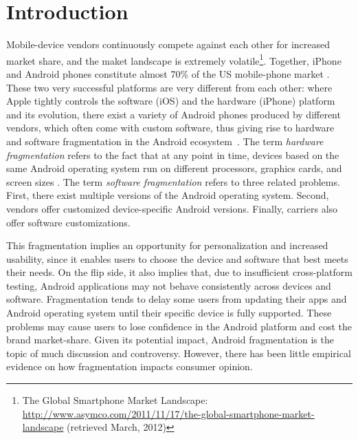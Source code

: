 \documentclass[10pt, conference, compsocconf]{IEEEtran}
\begin{document}
%
\IEEEpeerreviewmaketitle



\section{Introduction}

Mobile-device vendors continuously compete against each other for
increased market share, and the maket landscape is extremely
volatile\footnote{The Global Smartphone Market Landscape:
  \url{http://www.asymco.com/2011/11/17/the-global-smartphone-market-landscape}
  (retrieved March, 2012)}. Together, iPhone and Android phones
constitute almost 70\% of the US mobile-phone market
\cite{usmarket}. These two very successful platforms are very
different from each other: where Apple tightly controls the software
(iOS) and the hardware (iPhone) platform and its evolution, there
exist a variety of Android phones produced by different vendors, which
often come with custom software, thus giving rise to hardware and
software fragmentation in the Android ecosystem~\cite{analysis}. The
term {\em hardware fragmentation} refers to the fact that at any point
in time, devices based on the same Android operating system run on
different processors, graphics cards, and screen sizes
\cite{analysis}. The term {\em software fragmentation} refers to three
related problems. First, there exist multiple versions of the Android
operating system. Second, vendors offer customized device-specific
Android versions. Finally, carriers also offer software
customizations.

This fragmentation implies an opportunity for personalization and
increased usability, since it enables users to choose the device and
software that best meets their needs. On the flip side, it also
implies that, due to insufficient cross-platform
testing\cite{testing}, Android applications may not behave
consistently across devices and software.  
Fragmentation tends to delay some users from updating their apps
and Android operating system until their specific device is fully supported.
These problems
may cause users to lose confidence in the Android platform and cost
the brand market-share. Given its potential impact, Android
fragmentation is the topic of much discussion and
controversy. However, there has been little empirical evidence on how
fragmentation impacts consumer opinion.
\end{document}
